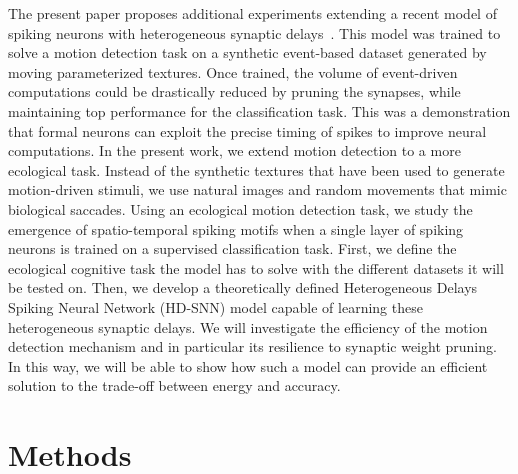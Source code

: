\documentclass[default]{sn-jnl}%
\theoremstyle{thmstyleone}%
\theoremstyle{thmstyletwo}%
\theoremstyle{thmstylethree}%
\begin{document}
The present paper proposes additional experiments extending a recent model of spiking neurons with heterogeneous synaptic delays~\cite{grimaldi_learning_2022}. This model was trained to solve a motion detection task on a synthetic event-based dataset generated by moving parameterized textures. Once trained, the volume of event-driven computations could be drastically reduced by pruning the synapses, while maintaining top performance for the classification task. This was a demonstration that formal neurons can exploit the precise timing of spikes to improve neural computations. In the present work, we extend motion detection to a more ecological task. Instead of the synthetic textures that have been used to generate motion-driven stimuli, we use natural images and random movements that mimic biological saccades. Using an ecological motion detection task, we study the emergence of spatio-temporal spiking motifs when a single layer of spiking neurons is trained on a supervised classification task. First, we define the ecological cognitive task the model has to solve with the different datasets it will be tested on. Then, we develop a theoretically defined Heterogeneous Delays Spiking Neural Network (HD-SNN) model capable of learning these heterogeneous synaptic delays. We will investigate the efficiency of the motion detection mechanism and in particular its resilience to synaptic weight pruning. In this way, we will be able to show how such a model can provide an efficient solution to the trade-off between energy and accuracy.
%
\section{Methods}
\label{sec:methods}
%
\end{document}
